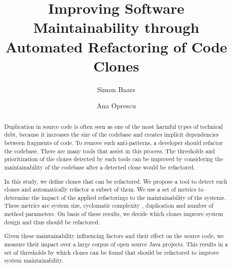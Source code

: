 \documentclass[sigconf,review]{acmart}
\begin{document}
\title{Improving Software Maintainability through Automated Refactoring of Code Clones}

\author{Simon Baars}

\author{Ana Oprescu}

\begin{abstract}
Duplication in source code is often seen as one of the most harmful types of technical debt, because it increases the size of the codebase and creates implicit dependencies between fragments of code. To remove such anti-patterns, a developer should refactor the codebase. There are many tools that assist in this process. The thresholds and prioritization of the clones detected by such tools can be improved by considering the maintainability of the codebase after a detected clone would be refactored.

In this study, we define clones that can be refactored. We propose a tool to detect such clones and automatically refactor a subset of them. We use a set of metrics to determine the impact of the applied refactorings to the maintainability of the systems. These metrics are system size, cyclomatic complexity \cite{mccabe1976complexity}, duplication and number of method parameters. On basis of these results, we decide which clones improve system design and thus should be refactored. %

Given these maintainability influencing factors and their effect on the source code, we measure their impact over a large corpus of open source Java projects. This results in a set of thresholds by which clones can be found that should be refactored to improve system maintainability.
\end{abstract}


\maketitle
\end{document}
